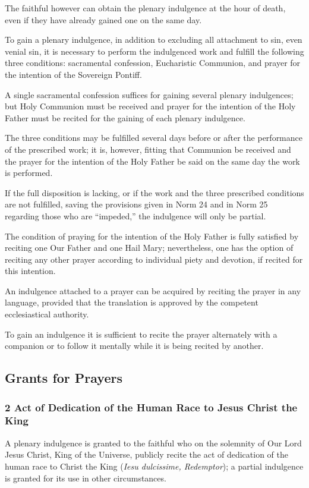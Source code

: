 \documentclass[12pt]{article}
\newcommand{\foreign}[1]{\textsl{#1}}
\begin{document}
 The faithful however can obtain the plenary indulgence at the hour of death, even if they have already gained one on the same day.

 To gain a plenary indulgence, in addition to excluding all attachment to sin, even venial sin, it is necessary to perform the indulgenced work and fulfill the following three conditions:
sacramental confession, Eucharistic Communion, and prayer for the intention of the Sovereign Pontiff.

 A single sacramental confession suffices for gaining several plenary indulgences;
but Holy Communion must be received and prayer for the intention of the Holy Father must be recited for the gaining of each plenary indulgence.

 The three conditions may be fulfilled several days before or after the performance of the prescribed work;
it is, however, fitting that Communion be received and the prayer for the intention of the Holy Father be said on the same day the work is performed.

 If the full disposition is lacking, or if the work and the three prescribed conditions are not fulfilled, saving the provisions given in Norm 24 and in Norm 25 regarding those who are ``impeded,'' the indulgence will only be partial.

 The condition of praying for the intention of the Holy Father is fully satisfied by reciting one Our Father and one Hail Mary;
nevertheless, one has the option of reciting any other prayer according to individual piety and devotion, if recited for this intention.

 An indulgence attached to a prayer can be acquired by reciting the prayer in any language, provided that the translation is approved by the competent ecclesiastical authority.

 To gain an indulgence it is sufficient to recite the prayer alternately with a companion or to follow it mentally while it is being recited by another.

\subsection{Grants for Prayers}
\newcommand{\grant}[2]{\subsubsection*{#1 #2}}
\newcommand{\subgrant}[1]{§#1.}
\newcommand{\subsubgrant}[1]{#1$^\circ$}
\hypertarget{grant2}{\grant{2}{Act of Dedication of the Human Race to Jesus Christ the King}}
A plenary indulgence is granted to the faithful who on the solemnity of Our Lord Jesus Christ, King of the Universe, publicly recite the act of dedication of the human race to Christ the King (\foreign{Iesu dulcissime, Redemptor});
a partial indulgence is granted for its use in other circumstances.
\end{document}

